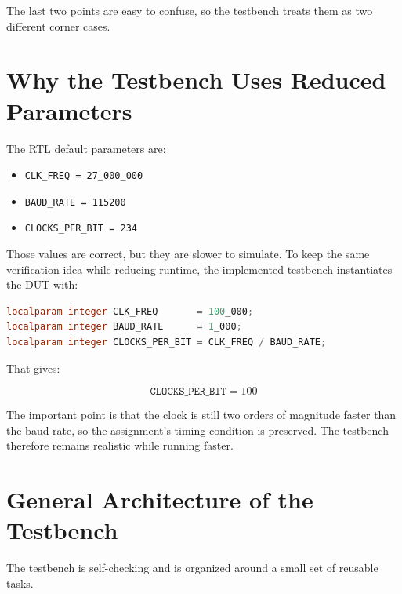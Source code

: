 \documentclass[12pt]{article}
\begin{document}
The last two points are easy to confuse, so the testbench treats them as two
different corner cases.

\section{Why the Testbench Uses Reduced Parameters}

The RTL default parameters are:

\begin{itemize}
    \item \texttt{CLK\_FREQ = 27\_000\_000}
    \item \texttt{BAUD\_RATE = 115200}
    \item \texttt{CLOCKS\_PER\_BIT = 234}
\end{itemize}

Those values are correct, but they are slower to simulate. To keep the same
verification idea while reducing runtime, the implemented testbench instantiates
the DUT with:

\begin{lstlisting}[language=Verilog]
localparam integer CLK_FREQ       = 100_000;
localparam integer BAUD_RATE      = 1_000;
localparam integer CLOCKS_PER_BIT = CLK_FREQ / BAUD_RATE;
\end{lstlisting}

That gives:

\[
\texttt{CLOCKS\_PER\_BIT} = 100
\]

The important point is that the clock is still two orders of magnitude faster
than the baud rate, so the assignment's timing condition is preserved. The
testbench therefore remains realistic while running faster.

\section{General Architecture of the Testbench}

The testbench is self-checking and is organized around a small set of reusable
tasks.
\end{document}
